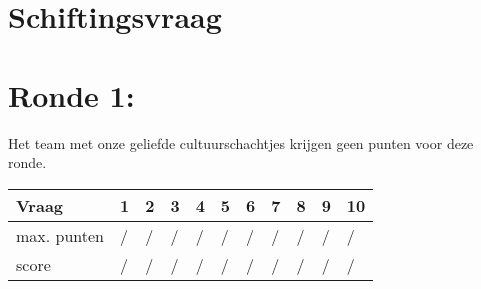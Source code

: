 \begin{center}
\end{center}
\vspace{5mm}
 
 
\vspace{5mm}
 
\section{Schiftingsvraag}
\enspace\hrulefill

\section{Ronde 1:}
\begin{questions}

\question[1] \enspace\hrulefill
\question[1] \enspace\hrulefill
\question[1] \enspace\hrulefill
\question[1] \enspace\hrulefill
\question[1] \enspace\hrulefill
\question[1] \enspace\hrulefill
\question[1] \enspace\hrulefill
\question[1] \enspace\hrulefill
\question[1] \enspace\hrulefill
\question[1] \enspace\hrulefill

\end{questions}
\vspace{3em}
Het team met onze geliefde cultuurschachtjes krijgen geen punten voor deze ronde.
\begin{table}[!b]
\centering
\begin{tabular}{|l|l|l|l|l|l|l|l|l|l|l|}
\hline
Vraag       & 1 & 2 & 3 & 4 & 5 & 6 & 7 & 8 & 9 & 10 \\ \hline
max. punten & / & / & / & / & / & / & / & / & / & /  \\ \hline
score       & / & / & / & / & / & / & / & / & / & /  \\ \hline
\end{tabular}
\end{table}
\newpage
